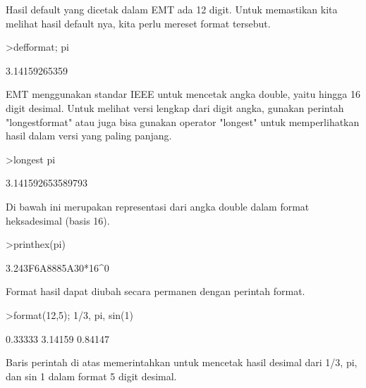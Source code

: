 \documentclass{article}
\begin{document}
\begin{eulernotebook}
\begin{euleroutput}
  [11,  31,  41]
\end{euleroutput}
\begin{eulercomment}
Hasil default yang dicetak dalam EMT ada 12 digit. Untuk memastikan
kita melihat hasil default nya, kita perlu mereset format tersebut.
\end{eulercomment}
\begin{eulerprompt}
>defformat; pi
\end{eulerprompt}
\begin{euleroutput}
  3.14159265359
\end{euleroutput}
\begin{eulercomment}
EMT menggunakan standar IEEE untuk mencetak angka double, yaitu hingga
16 digit desimal. Untuk melihat versi lengkap dari digit angka,
gunakan perintah "longestformat" atau juga bisa gunakan operator
"longest" untuk memperlihatkan hasil dalam versi yang paling panjang.
\end{eulercomment}
\begin{eulerprompt}
>longest pi
\end{eulerprompt}
\begin{euleroutput}
        3.141592653589793 
\end{euleroutput}
\begin{eulercomment}
Di bawah ini merupakan representasi dari angka double dalam format
heksadesimal (basis 16).
\end{eulercomment}
\begin{eulerprompt}
>printhex(pi)
\end{eulerprompt}
\begin{euleroutput}
  3.243F6A8885A30*16^0
\end{euleroutput}
\begin{eulercomment}
Format hasil dapat diubah secara permanen dengan perintah format.
\end{eulercomment}
\begin{eulerprompt}
>format(12,5); 1/3, pi, sin(1)
\end{eulerprompt}
\begin{euleroutput}
      0.33333 
      3.14159 
      0.84147 
\end{euleroutput}
\begin{eulercomment}
Baris perintah di atas memerintahkan untuk mencetak hasil desimal dari
1/3, pi, dan sin 1 dalam format 5 digit desimal.


\end{eulercomment}
\end{eulernotebook}
\end{document}
